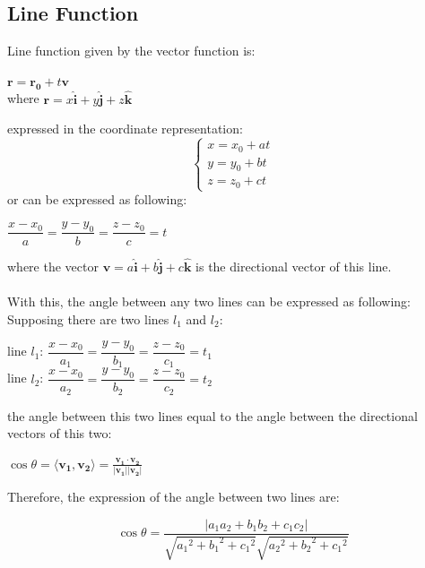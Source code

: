 \documentclass[UTF8,a4paper, 10pt, openany]{book}
\begin{document}
\subsection{Line Function}
Line function given by the vector function is:
\begin{center}
$\mathbf{r}=\mathbf{r_0}+t\mathbf{v}$\\
where $\mathbf{r}=x\mathbf{\hat{i}}+y\mathbf{\hat{j}}+z\mathbf{\hat{k}}$
\end{center}
expressed in the coordinate representation:
\[\begin{cases}
x=x_0+at \\
y=y_0+bt \\
z=z_0+ct
\end{cases}\]
or can be expressed as following:
\begin{center}
$\dfrac{x-x_0}{a}=\dfrac{y-y_0}{b}=\dfrac{z-z_0}{c}=t$
\end{center}
where the vector $\mathbf{v}=a\mathbf{\hat{i}}+b\mathbf{\hat{j}}+c\mathbf{\hat{k}}$ is the directional vector of this line.\\ \\
With this, the angle between any two lines can be expressed as following:\\
Supposing there are two lines $l_1$ and $l_2$:
\begin{center}
line $l_1$: $\dfrac{x-x_0}{a_1}=\dfrac{y-y_0}{b_1}=\dfrac{z-z_0}{c_1}=t_1$\\
line $l_2$: $\dfrac{x-x_0}{a_2}=\dfrac{y-y_0}{b_2}=\dfrac{z-z_0}{c_2}=t_2$
\end{center}
the angle between this two lines equal to the angle between the directional vectors of this two:
\begin{center}
$\cos \theta = \langle \mathbf{v_1},\mathbf{v_2} \rangle =\frac{\mathbf{v_1}\cdot \mathbf{v_2}}{|\mathbf{v_1}||\mathbf{v_2}|}$\\
\end{center}

Therefore, the expression of the angle between two lines are:

\begin{equation}
\boxed{\cos \theta =\dfrac{|a_1a_2+b_1b_2+c_1c_2|}{\sqrt{{a_1}^2+{b_1}^2+{c_1}^2}\sqrt{{a_2}^2+{b_2}^2+{c_1}^2}}}
\end{equation}
\end{document}
